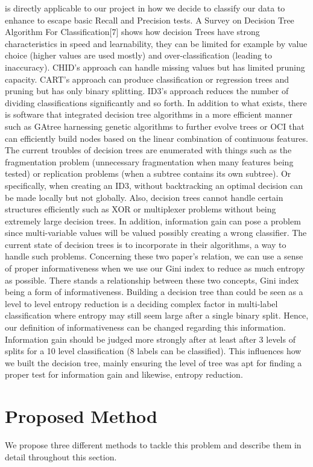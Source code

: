 \documentclass[acmtog, authorversion]{acmart}
\begin{document}
is directly applicable to our project in how we decide to classify our data to enhance to escape basic Recall and Precision tests. 
A Survey on Decision Tree Algorithm For Classification[7] shows how decision Trees have strong characteristics in speed and learnability, they can 
be limited for example by value choice (higher values are used mostly) and over-classification (leading to inaccuracy). CHID’s approach can handle missing 
values but has limited pruning capacity. CART’s approach can produce classification or regression trees and pruning but has only binary splitting. ID3’s 
approach reduces the number of dividing classifications significantly and so forth. In addition to what exists, there is software that integrated decision 
tree algorithms in a more efficient manner such as GAtree harnessing genetic algorithms to further evolve trees or OCI that can efficiently build nodes 
based on the linear combination of continuous features. The current troubles of decision trees are enumerated with things such as the fragmentation 
problem (unnecessary fragmentation when many features being tested) or replication problems (when a subtree contains its own subtree). Or specifically, 
when creating an ID3, without backtracking an optimal decision can be made locally but not globally. Also, decision trees cannot handle certain structures 
efficiently such as XOR or multiplexer problems without being extremely large decision trees. In addition, information gain can pose a problem since 
multi-variable values will be valued possibly creating a wrong classifier. The current state of decision trees is to incorporate in their algorithms, 
a way to handle such problems. Concerning these two paper's relation, we can use a sense of proper informativeness when we use our Gini index to reduce as much entropy as possible. There stands a relationship between these two concepts, Gini index being a form of informativeness. Building a decision tree than could be seen as a level to level entropy reduction is a deciding complex factor in multi-label classification where entropy may still seem large after a single binary split. Hence, our definition of informativeness can be changed regarding this information. Information gain should be judged more strongly after at least after 3 levels of splits for a 10 level classification (8 labels can be classified). This influences how we built the decision tree, mainly ensuring the level of tree was apt for finding a proper test for information gain and likewise, entropy reduction. 
\section{Proposed Method}
We propose three different methods to tackle this problem and describe them in detail throughout this section.
\end{document}
